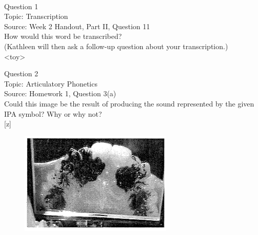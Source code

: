 \documentclass[12pt]{article}
\begin{document}
\newpage

\begin{center}
\textbf{{\color{red}{\HUGE END OF EXAM}}}\\

\end{center}
\newpage

\begin{center}
\textbf{{\color{blue}{\HUGE START OF EXAM\\}}}

\textbf{{\color{blue}{\HUGE Student ID: 44746\\}}}

\textbf{{\color{blue}{\HUGE \\}}}

\end{center}
\newpage

{\large Question 1}\\

Topic: Transcription\\
Source: Week 2 Handout, Part II, Question 11\\

How would this word be transcribed?\\ (Kathleen will then ask a follow-up question about your transcription.)\\

<toy>


\newpage

{\large Question 2}\\

Topic: Articulatory Phonetics\\
Source: Homework 1, Question 3(a)\\

Could this image be the result of producing the sound represented by the given IPA symbol? Why or why not?\\

{[z]}

\begin{figure}[H]
\includegraphics{../images/staticpalatography_fricative.png}
\end{figure}
\end{document}
